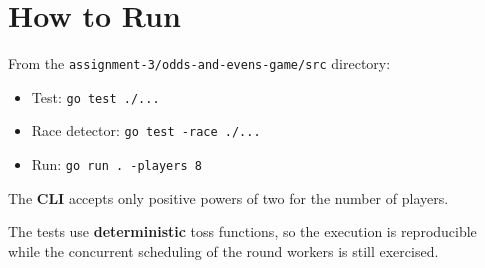 \section{How to Run}

From the \texttt{assignment-3/odds-and-evens-game/src} directory:

\begin{itemize}
  \item Test: \texttt{go test ./...}
  \item Race detector: \texttt{go test -race ./...}
  \item Run: \texttt{go run . -players 8}
\end{itemize}

The \textbf{CLI} accepts only positive powers of two for the number of players.

The tests use \textbf{deterministic} toss functions, so the execution is reproducible while the concurrent scheduling of
the round workers is still exercised.
